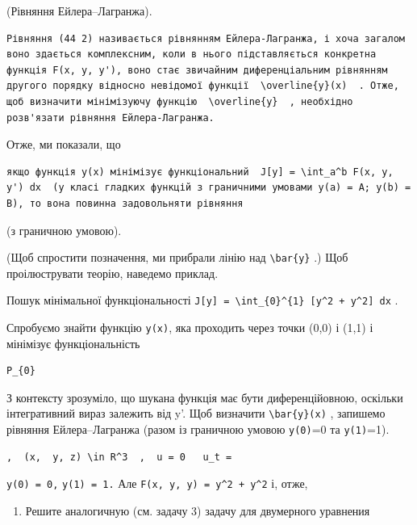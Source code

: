 \documentclass[
  ukrainian,
]{article}
\providecommand{\tightlist}{%
  \setlength{\itemsep}{0pt}\setlength{\parskip}{0pt}}
\begin{document}
(Рівняння Ейлера--Лагранжа).

\begin{verbatim}
Рівняння (44 2) називається рівнянням Ейлера-Лагранжа, і хоча загалом воно здається комплексним, коли в нього підставляється конкретна функція F(x, y, y'), воно стає звичайним диференціальним рівнянням другого порядку відносно невідомої функції  \overline{y}(x)  . Отже, щоб визначити мінімізуючу функцію  \overline{y}  , необхідно розв'язати рівняння Ейлера-Лагранжа.
\end{verbatim}

Отже, ми показали, що

\begin{verbatim}
якщо функція y(x) мінімізує функціональний  J[y] = \int_a^b F(x, y, y') dx  (у класі гладких функцій з граничними умовами y(a) = A; y(b) = B), то вона повинна задовольняти рівняння
\end{verbatim}

(з граничною умовою).

(Щоб спростити позначення, ми прибрали лінію над
\texttt{\textbackslash{}bar\{y\}} .) Щоб проілюструвати теорію, наведемо
приклад.

Пошук мінімальної функціональності
\texttt{J{[}y{]}\ =\ \textbackslash{}int\_\{0\}\^{}\{1\}\ {[}y\^{}2\ +\ y\textquotesingle{}\^{}2{]}\ dx}
.

Спробуємо знайти функцію \texttt{y(x)}, яка проходить через точки (0,0)
і (1,1) і мінімізує функціональність

\begin{verbatim}
P_{0}
\end{verbatim}

З контексту зрозуміло, що шукана функція має бути диференційовною,
оскільки інтегративний вираз залежить від y'. Щоб визначити
\texttt{\textbackslash{}bar\{y\}(x)} , запишемо рівняння
Ейлера--Лагранжа (разом із граничною умовою \texttt{y(0)}=0 та
\texttt{y(1)}=1).

\begin{verbatim}
,  (x,  y, z) \in R^3  ,  u = 0   u_t =
\end{verbatim}

\texttt{y(0)\ =\ 0,} \texttt{y(1)\ =\ 1.} Але
\texttt{F(x,\ y,\ y\textquotesingle{})\ =\ y\^{}2\ +\ y\textquotesingle{}\^{}2}
і, отже,

\begin{enumerate}
\def\labelenumi{\arabic{enumi}.}
\setcounter{enumi}{3}
\tightlist
\item
  Решите аналогичную (см. задачу 3) задачу для двумерного уравнения
\end{enumerate}
\end{document}
